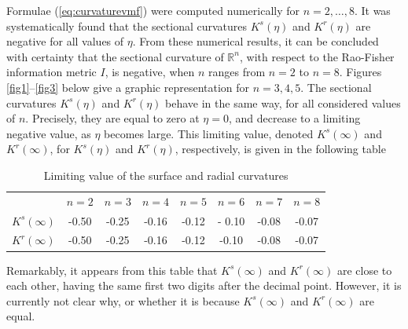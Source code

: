 \documentclass{svmult}
\begin{document}
Formulae (\ref{eq:curvaturevmf}) were computed numerically for $n = 2,\ldots,8$. It was systematically found that the sectional curvatures $K^s(\eta)$ and $K^r(\eta)$ are negative for all values of $\eta$. From these numerical results, it can be concluded with certainty that the sectional curvature of $\mathbb{R}^n$, with respect to the Rao-Fisher information metric $I$, is negative, when $n$ ranges from $n=2$ to $n=8$. Figures \ref{fig1}--\ref{fig3} below give a graphic representation for $n = 3,4, 5$. The sectional curvatures $K^s(\eta)$ and $K^r(\eta)$ behave in the same way, for all considered values of $n$. Precisely, they are equal to zero at $\eta = 0$, and decrease to a limiting negative value, as $\eta$ becomes large. This limiting value, denoted $K^s(\infty)$ and $K^r(\infty)$, for $K^s(\eta)$ and $K^r(\eta)$, respectively, is given in the following table
\begin{table}[!h]
\begin{center} 
\begin{tabular}{lccccccc}
                    & $n=2$ & $n=3$ & $n=4$ & $n=5$ & $n=6$ & $n=7$ & $n=8$ \\[0.1cm] 
$K^s(\infty)$ &  -0.50 & -0.25 & -0.16 & -0.12 & - 0.10 & -0.08 & -0.07\\[0.12cm]
$K^r(\infty)$ & -0.50 & -0.25 & -0.16 & -0.12 & -0.10 & -0.08 &  -0.07\\
\end{tabular}
\caption{Limiting value of the surface and radial curvatures}
\label{table}
\end{center}
\end{table}

Remarkably, it appears from this table that $K^s(\infty)$ and $K^r(\infty)$ are close to each other, having the same first two digits after the decimal point. However, it is currently not clear why, or whether it is because $K^s(\infty)$ and $K^r(\infty)$ are equal. 
\end{document}
